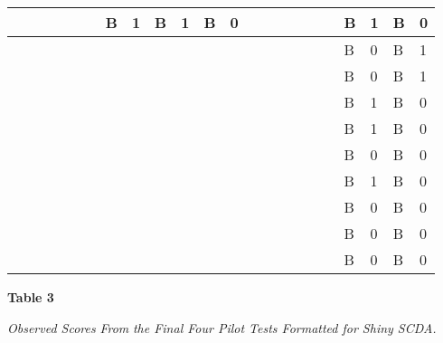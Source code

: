 \documentclass{article}
\begin{document}
\begin{table}
\begin{tabular}{l  l  l  l  l  l  l  l  l  l  l  l  l  l  l  l  l  l}
  &   &   &   & B & 1 & B & 1 & B & 0 &   &   &   &   & B & 1 & B & 0\\ \midrule
  &   &   &   &   &   &   &   &   &   &   &   &   &   & B & 0 & B & 1\\ \midrule
  &   &   &   &   &   &   &   &   &   &   &   &   &   & B & 0 & B & 1\\ \midrule
  &   &   &   &   &   &   &   &   &   &   &   &   &   & B & 1 & B & 0\\ \midrule
  &   &   &   &   &   &   &   &   &   &   &   &   &   & B & 1 & B & 0\\ \midrule
  &   &   &   &   &   &   &   &   &   &   &   &   &   & B & 0 & B & 0\\ \midrule
  &   &   &   &   &   &   &   &   &   &   &   &   &   & B & 1 & B & 0\\ \midrule
  &   &   &   &   &   &   &   &   &   &   &   &   &   & B & 0 & B & 0\\ \midrule
  &   &   &   &   &   &   &   &   &   &   &   &   &   & B & 0 & B & 0\\ \midrule
  &   &   &   &   &   &   &   &   &   &   &   &   &   & B & 0 & B & 0\\ \bottomrule


\end{tabular}


\end{table}


\textbf{Table 3}

\emph{Observed Scores }\emph{From}\emph{ the Final Four Pilot Tests Formatted for Shiny SCDA.}
\end{document}
